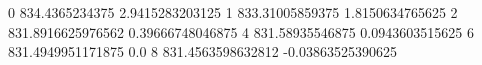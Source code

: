 0 834.4365234375 2.9415283203125
1 833.31005859375 1.8150634765625
2 831.8916625976562 0.39666748046875
4 831.58935546875 0.0943603515625
6 831.4949951171875 0.0
8 831.4563598632812 -0.03863525390625
